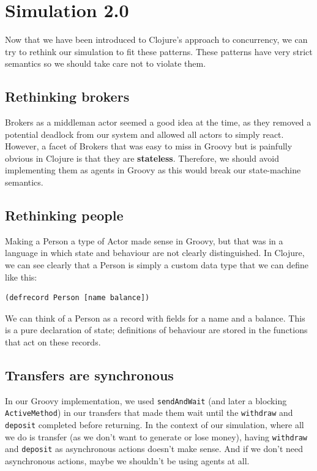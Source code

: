 \documentclass[a4paper,12pt]{kth-mag}
\begin{document}
\section{Simulation 2.0}

Now that we have been introduced to Clojure's approach to concurrency, we can try to rethink our simulation to fit these patterns. These patterns have very strict semantics so we should take care not to violate them.

\subsection{Rethinking brokers}

Brokers as a middleman actor seemed a good idea at the time, as they removed a potential deadlock from our system and allowed all actors to simply react. However, a facet of Brokers that was easy to miss in Groovy but is painfully obvious in Clojure is that they are \textbf{stateless}. Therefore, we should avoid implementing them as agents in Groovy as this would break our state-machine semantics.

\subsection{Rethinking people}

Making a Person a type of Actor made sense in Groovy, but that was in a language in which state and behaviour are not clearly distinguished. In Clojure, we can see clearly that a Person is simply a custom data type that we can define like this:

\begin{listing}[H]
	\begin{verbatim}
(defrecord Person [name balance])
	\end{verbatim}
\end{listing}

We can think of a Person as a record with fields for a name and a balance. This is a pure declaration of state; definitions of behaviour are stored in the functions that act on these records.

\subsection{Transfers are synchronous}

In our Groovy implementation, we used \texttt{sendAndWait} (and later a blocking \texttt{ActiveMethod}) in our transfers that made them wait until the \texttt{withdraw} and \texttt{deposit} completed before returning. In the context of our simulation, where all we do is transfer (as we don't want to generate or lose money), having \texttt{withdraw} and \texttt{deposit} as asynchronous actions doesn't make sense. And if we don't need asynchronous actions, maybe we shouldn't be using agents at all.
\end{document}
